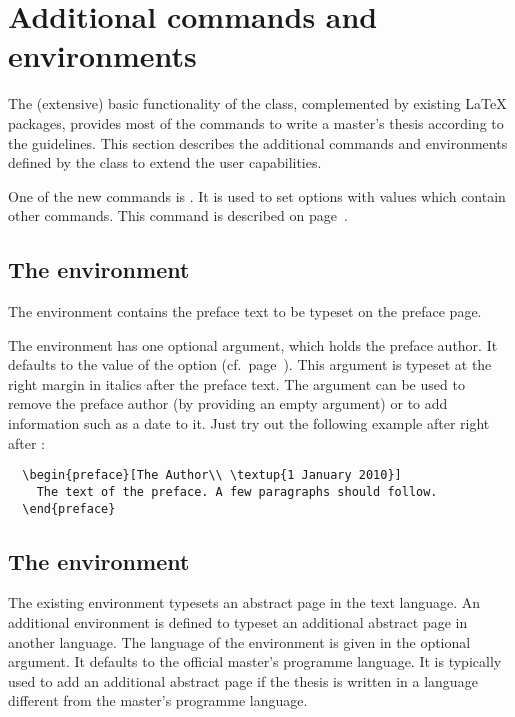 \section{Additional commands and environments}
The (extensive) basic functionality of the  class, complemented
by existing LaTeX packages, provides most of the commands to write a master's
thesis according to the guidelines. This section describes the additional
commands and environments defined by the  class to extend the
user capabilities.

One of the new commands is . It is used to set
options with values which contain other commands. This command is described
on page~\pageref{com:setup}.

\subsection[\env{preface}]{The  environment}
The  environment contains the preface text to be typeset on
the preface page.

The environment has one optional argument, which holds the preface author.
It defaults to the value of the  option (cf.\
page~\pageref{opt:author}). This argument is typeset at the right margin in
italics after the preface text. The argument can be used to remove the
preface author (by providing an empty argument) or to add information such as a
date to it. Just try out the following example after right after
\verb"":
\begin{verbatim}
  \begin{preface}[The Author\\ \textup{1 January 2010}]
    The text of the preface. A few paragraphs should follow.
  \end{preface}
\end{verbatim}

\subsection[]{The  environment}
The existing  environment typesets an abstract page in the
text language. An additional \env{abstract*} environment is defined to
typeset an additional abstract page in another language.
The language of the  environment is given in the optional
argument. It defaults to the official master's programme language. It is
typically used to add an additional abstract page if the thesis is written in a
language different from the master's programme language.

